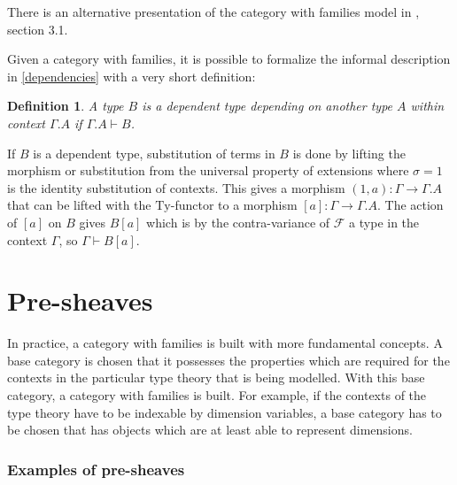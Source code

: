 \documentclass[12pt,a4paper,twoside,xetex]{book} %
\newcommand{\keyword}[1]{\emph{#1}\index{#1}}
\newtheorem{definition}[theorem]{Definition}
\begin{document}
There is an alternative presentation of the category with families model in 
\cite{Orton2019}, section 3.1.

Given a category with families, it is possible to formalize the informal 
description in \cref{dependencies} with a very short definition:

\begin{definition}\label{depmodel}
A type $B$ is a \keyword{dependent type} depending on another type $A$ within 
context $\Gamma.A$ if $\Gamma.A \vdash B$.
\end{definition}

If $B$ is a dependent type, substitution of terms in $B$ is done by lifting the 
morphism or substitution from the universal property of extensions where 
$\sigma = 1$ is the identity substitution of contexts. This gives a morphism 
$\left(1,a\right):\Gamma\rightarrow\Gamma.A$ that can be lifted with the 
$\text{Ty}$-functor to a morphism 
$\left[a\right]:\Gamma\rightarrow\Gamma.A$. The action of $\left[a\right]$ on 
$B$ gives $B\left[a\right]$ which is by the contra-variance of $\mathcal{F}$ a 
type in the context $\Gamma$, so $\Gamma\vdash B[a]$.



\section{Pre-sheaves}

In practice, a category with families is built with more fundamental concepts. 
A base category is chosen that it possesses the properties which are required  for the contexts in the particular type theory that is being modelled. With this 
base category, a category with families is built. For example, if the 
contexts of the type theory have to be indexable by dimension variables, a base 
category has to be chosen that has objects which are at least able to represent dimensions.

\subsubsection{Examples of pre-sheaves}\label{pre-sheafexs}
\end{document}
